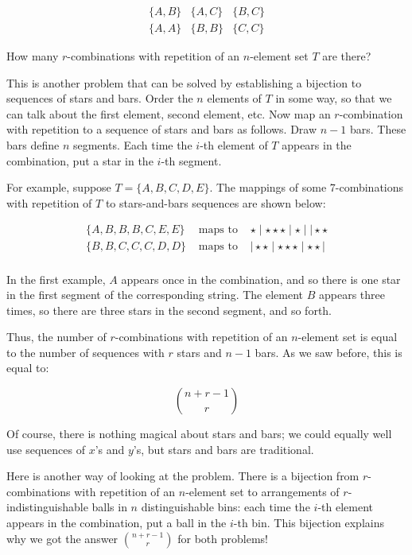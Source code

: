 \documentclass[twoside,12pt]{article}
\newcommand{\beqn}{\begin{eqnarray*}}
\newcommand{\eeqn}{\end{eqnarray*}}
\begin{document}
\[
\begin{array}{ccc}
\{ A, B \} & \{ A, C \} & \{ B, C \} \\
\{ A, A \} & \{ B, B \} & \{ C, C \}
\end{array}
\]

\noindent How many $r$-combinations with repetition of an $n$-element
set $T$ are there?

This is another problem that can be solved by establishing a bijection
to sequences of stars and bars.  Order the $n$ elements of $T$ in some
way, so that we can talk about the first element, second element, etc.
Now map an $r$-combination with repetition to a sequence of stars and
bars as follows.  Draw $n-1$ bars.  These bars define $n$ segments.
Each time the $i$-th element of $T$ appears in the combination, put a
star in the $i$-th segment.

For example, suppose $T = \{ A, B, C, D, E \}$.  The mappings of some
7-combinations with repetition of $T$ to stars-and-bars sequences are
shown below:

\beqn
\{ A, B, B, B, C, E, E \}
& \text{ maps to } &
\star \mid \star \star \star \mid \star \mid \mid \star \star \\
\{ B, B, C, C, C, D, D \}
& \text{ maps to } &
\mid \star \star \mid \star \star \star \mid \star \star \mid \\
\eeqn

\noindent In the first example, $A$ appears once in the combination,
and so there is one star in the first segment of the corresponding
string.  The element $B$ appears three times, so there are three stars
in the second segment, and so forth.

Thus, the number of $r$-combinations with repetition of an $n$-element
set is equal to the number of sequences with $r$ stars and $n-1$ bars.
As we saw before, this is equal to:

\[
\binom{n + r - 1}{r}
\]

\noindent Of course, there is nothing magical about stars and bars; we
could equally well use sequences of $x$'s and $y$'s, but stars and
bars are traditional.

Here is another way of looking at the problem.  There is a bijection
from $r$-combinations with repetition of an $n$-element set to
arrangements of $r$-indistinguishable balls in $n$ distinguishable
bins: each time the $i$-th element appears in the combination, put a
ball in the $i$-th bin.  This bijection explains why we got the answer
$\binom{n + r - 1}{r}$ for both problems!
\end{document}
